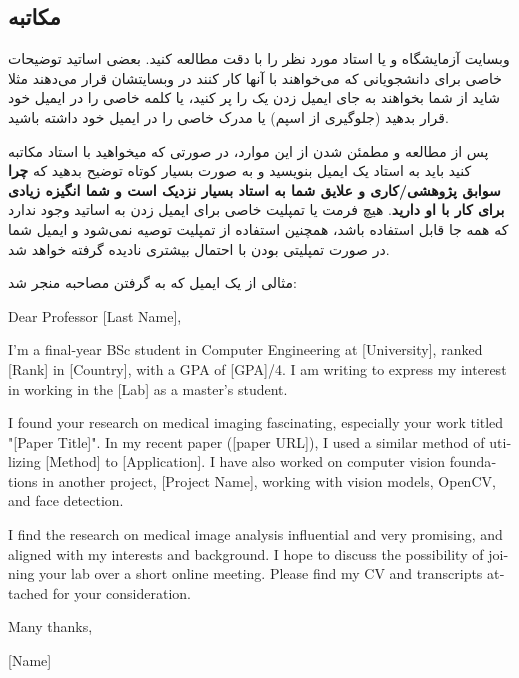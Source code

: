 \subsection{مکاتبه}
وبسایت آزمایشگاه و یا  استاد مورد نظر را با دقت مطالعه کنید. بعضی اساتید توضیحات خاصی برای 
دانشجویانی که می‌خواهند با آنها کار کنند در وبسایتشان قرار می‌دهند مثلا شاید از شما بخواهند به جای ایمیل زدن یک  را 
پر کنید، یا کلمه خاصی را در  ایمیل خود قرار بدهید (جلوگیری از اسپم) یا مدرک خاصی را در ایمیل خود داشته باشید. 

پس از مطالعه و مطمئن شدن از این موارد، در صورتی که میخواهید با استاد مکاتبه کنید باید به استاد یک ایمیل بنویسید و به صورت 
بسیار کوتاه توضیح بدهید که \textbf{چرا سوابق پژوهشی/کاری و علایق شما به استاد بسیار نزدیک است و شما انگیزه ‌زیادی برای کار با او دارید}. 
هیچ فرمت یا تمپلیت خاصی برای ایمیل زدن به اساتید وجود ندارد که همه جا قابل استفاده باشد، همچنین استفاده از تمپلیت توصیه نمی‌شود و 
ایمیل شما در صورت تمپلیتی بودن با احتمال بیشتری نادیده گرفته خواهد شد. 

مثالی از یک ایمیل که به گرفتن مصاحبه منجر شد:

\begin{framed}
\begin{latin}

\raggedleft               

Dear Professor [Last Name],

I'm a final-year BSc student in Computer Engineering at [University], ranked [Rank] in [Country], with a GPA of [GPA]/4. I am writing to express my interest in working in the [Lab] as a master's student.

I found your research on medical imaging fascinating, especially your work titled "[Paper Title]". In my recent paper ([paper URL]), I used a similar method of utilizing [Method] to [Application]. I have also worked on computer vision foundations in another project, [Project Name], working with vision models, OpenCV, and face detection.

I find the research on medical image analysis influential and very promising, and aligned with my interests and background. I hope to discuss the possibility of joining your lab over a short online meeting. Please find my CV and transcripts attached for your consideration.

Many thanks,

[Name]
\end{latin}
\end{framed}

